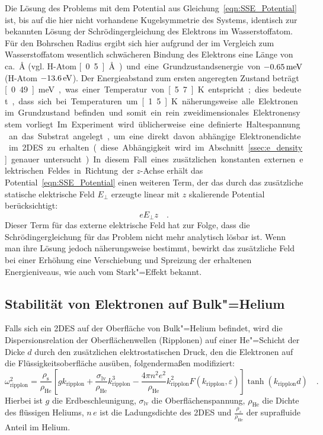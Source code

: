 Die Lösung des Problems mit dem Potential aus Gleichung~\eqref{eqn:SSE_Potential} ist, bis auf die hier nicht vorhandene Kugelsymmetrie des Systems, identisch zur bekannten Lösung der Schrödingergleichung des Elektrons im Wasserstoffatom. Für den Bohrschen Radius ergibt sich hier aufgrund der im Vergleich zum Wasserstoffatom wesentlich schwächeren Bindung des Elektrons eine Länge von ca.\ \unit[114]{ \AA} (vgl. H-Atom \unit[0.5]{\AA}) und eine Grundzustandsenergie von $\unit[-0.65]{meV}$ (H-Atom $\unit[-13.6]{eV}$). Der Energieabstand zum ersten angeregten Zustand beträgt \unit[0.49]{meV}, was einer Temperatur von \unit[5.7]{K} entspricht; dies bedeutet, dass sich bei Temperaturen um \unit[1.5]{K} näherungsweise alle Elektronen im Grundzustand befinden und somit ein rein zweidimensionales Elektronensystem vorliegt.

Im Experiment wird üblicherweise eine definierte Haltespannung an das Substrat angelegt, um eine direkt davon abhängige Elektronendichte im 2DES zu erhalten (diese Abhängigkeit wird im Abschnitt~\ref{ssec:e_density} genauer untersucht). In diesem Fall eines zusätzlichen konstanten externen elektrischen Feldes in Richtung der $z$-Achse erhält das  Potential~\eqref{eqn:SSE_Potential} einen weiteren Term, der das durch das zusätzliche statische elektrische Feld $E_\perp$ erzeugte linear mit $z$ skalierende Potential berücksichtigt:
	\begin{equation}
			\label{eqn:clamping_potential}
			e E_\perp z\quad.
	\end{equation}
Dieser Term für das externe elektrische Feld hat zur Folge, dass die Schrödingergleichung für das Problem nicht mehr analytisch lösbar ist. Wenn man ihre Lösung jedoch näherungsweise bestimmt, bewirkt das zusätzliche Feld bei einer Erhöhung eine Verschiebung und Spreizung der erhaltenen Energieniveaus, wie auch vom Stark"=Effekt bekannt. 

\subsection{Stabilität von Elektronen auf Bulk"=Helium}
\label{ssec:bulk_stabilitaet}

Falls sich ein 2DES auf der Oberfläche von Bulk"=Helium befindet, wird die Dispersionsrelation der Oberflächenwellen (Ripplonen) auf einer He"=Schicht der Dicke $d$ durch den zusätzlichen elektrostatischen Druck, den die Elektronen auf die Flüssigkeitsoberfläche ausüben, folgendermaßen modifiziert:
\begin{equation}
    \label{eqn:ripplon_dispersion_bulk}
        \omega^2_\text{ripplon}=\frac{\rho_\text{s}}{\rho_\text{He}}\left[g k_\text{ripplon}+
            \frac{\sigma_\text{lv}}{\rho_\text{He}} k^3_\text{ripplon}-\frac{4\pi n^2e^2}{\rho_\text{He}} k^2_\text{ripplon}F(k_\text{ripplon},\varepsilon)\right]\tanh(k_\text{ripplon} d)\quad.
\end{equation}
Hierbei ist $g$ die Erdbeschleunigung, $\sigma_\text{lv}$ die Oberflächenspannung, $\rho_\text{He}$ die Dichte des flüssigen Heliums, $n\,e$ ist die Ladungsdichte des 2DES und $\frac{\rho_s}{\rho_\text{He}}$ der suprafluide Anteil im Helium.

